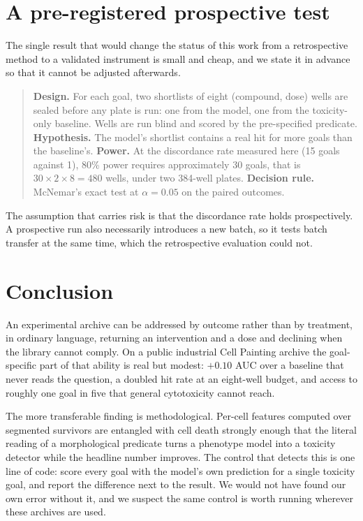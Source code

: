 \documentclass[11pt]{article}
\begin{document}
\section{A pre-registered prospective test}
\label{sec:prereg}

The single result that would change the status of this work from a retrospective method
to a validated instrument is small and cheap, and we state it in advance so that it
cannot be adjusted afterwards.

\begin{quote}
\textbf{Design.} For each goal, two shortlists of eight (compound, dose) wells are
sealed before any plate is run: one from the model, one from the toxicity-only baseline.
Wells are run blind and scored by the pre-specified predicate.
\textbf{Hypothesis.} The model's shortlist contains a real hit for more goals than the
baseline's.
\textbf{Power.} At the discordance rate measured here (15 goals against 1), 80\% power
requires approximately 30 goals, that is $30 \times 2 \times 8 = 480$ wells, under two
384-well plates.
\textbf{Decision rule.} McNemar's exact test at $\alpha = 0.05$ on the paired outcomes.
\end{quote}

The assumption that carries risk is that the discordance rate holds prospectively. A
prospective run also necessarily introduces a new batch, so it tests batch transfer at
the same time, which the retrospective evaluation could not.

\section{Conclusion}

An experimental archive can be addressed by outcome rather than by treatment, in
ordinary language, returning an intervention and a dose and declining when the library
cannot comply. On a public industrial Cell Painting archive the goal-specific part of
that ability is real but modest: $+0.10$ AUC over a baseline that never reads the
question, a doubled hit rate at an eight-well budget, and access to roughly one goal in
five that general cytotoxicity cannot reach.

The more transferable finding is methodological. Per-cell features computed over
segmented survivors are entangled with cell death strongly enough that the literal
reading of a morphological predicate turns a phenotype model into a toxicity detector
while the headline number improves. The control that detects this is one line of code:
score every goal with the model's own prediction for a single toxicity goal, and report
the difference next to the result. We would not have found our own error without it, and
we suspect the same control is worth running wherever these archives are used.
\end{document}
